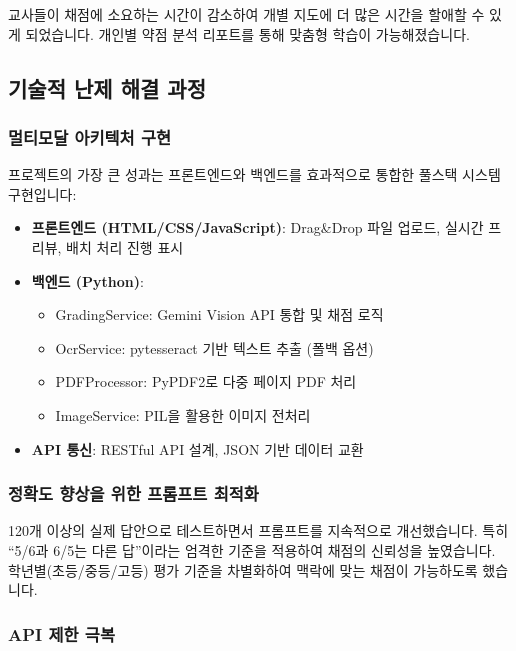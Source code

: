 교사들이 채점에 소요하는 시간이 감소하여 개별 지도에 더 많은 시간을 할애할 수 있게 되었습니다. 개인별 약점 분석 리포트를 통해 맞춤형 학습이 가능해졌습니다.

\subsection{기술적 난제 해결 과정}

\subsubsection{멀티모달 아키텍처 구현}

프로젝트의 가장 큰 성과는 프론트엔드와 백엔드를 효과적으로 통합한 풀스택 시스템 구현입니다:

\begin{itemize}[leftmargin=*]
    \item \textbf{프론트엔드 (HTML/CSS/JavaScript)}: Drag\&Drop 파일 업로드, 실시간 프리뷰, 배치 처리 진행 표시
    \item \textbf{백엔드 (Python)}: 
    \begin{itemize}
        \item GradingService: Gemini Vision API 통합 및 채점 로직
        \item OcrService: pytesseract 기반 텍스트 추출 (폴백 옵션)
        \item PDFProcessor: PyPDF2로 다중 페이지 PDF 처리
        \item ImageService: PIL을 활용한 이미지 전처리
    \end{itemize}
    \item \textbf{API 통신}: RESTful API 설계, JSON 기반 데이터 교환
\end{itemize}

\subsubsection{정확도 향상을 위한 프롬프트 최적화}

120개 이상의 실제 답안으로 테스트하면서 프롬프트를 지속적으로 개선했습니다. 특히 ``5/6과 6/5는 다른 답''이라는 엄격한 기준을 적용하여 채점의 신뢰성을 높였습니다. 학년별(초등/중등/고등) 평가 기준을 차별화하여 맥락에 맞는 채점이 가능하도록 했습니다.

\subsubsection{API 제한 극복}

